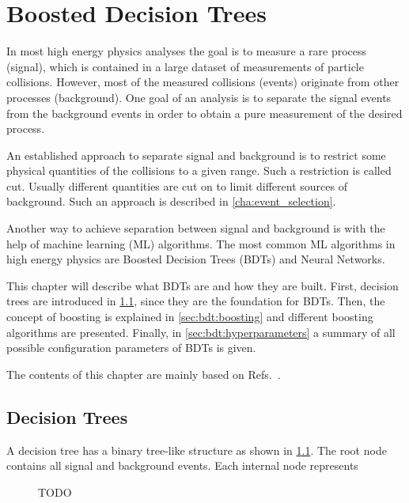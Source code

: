 \chapter{Boosted Decision Trees}\label{cha:boosted_decision_trees}

In most high energy physics analyses the goal is to measure a rare process (signal), which is contained in a
large dataset of measurements of particle collisions.
However, most of the measured collisions (events) originate from other processes (background).
One goal of an analysis is to separate the signal events from the background events in order to obtain a pure
measurement of the desired process.

An established approach to separate signal and background is to restrict some physical quantities of the collisions
to a given range.
Such a restriction is called cut.
Usually different quantities are cut on to limit different sources of background.
Such an approach is described in \cref{cha:event_selection}.

Another way to achieve separation between signal and background is with the help of machine learning (ML) algorithms.
The most common ML algorithms in high energy physics are Boosted Decision Trees (BDTs) and Neural Networks.

This chapter will describe what BDTs are and how they are built.
First, decision trees are introduced in \cref{sec:bdt:decision_trees}, since they are the foundation for BDTs.
Then, the concept of boosting is explained in \cref{sec:bdt:boosting} and different boosting algorithms are presented.
Finally, in \cref{sec:bdt:hyperparameters} a summary of all possible configuration parameters of BDTs is given.

The contents of this chapter are mainly based on Refs.~\cite{ML_HASTIE,ML_TMVA}.

\section{Decision Trees}\label{sec:bdt:decision_trees}

A decision tree has a binary tree-like structure as shown in \cref{fig:decision_tree}.
The root node contains all signal and background events.
Each internal node represents

\begin{figure}[htb]
    \begin{center}
        \caption{TODO}
        \label{fig:decision_tree}
    \end{center}
\end{figure}

